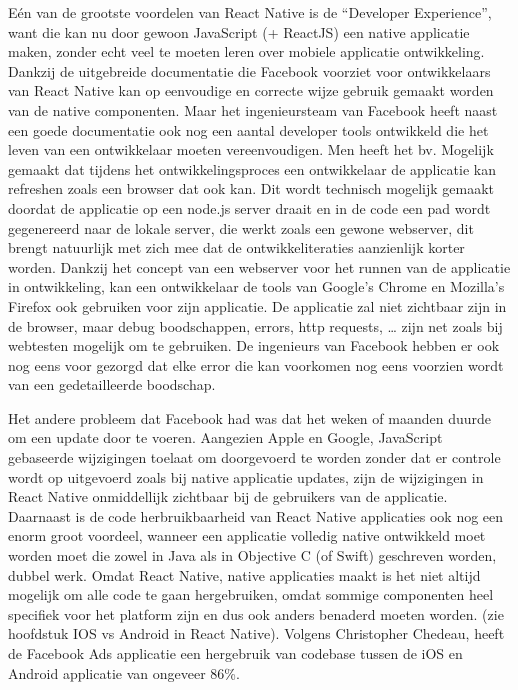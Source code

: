 Eén van de grootste voordelen van React Native is de ``Developer Experience'', want die kan nu door gewoon JavaScript (+ ReactJS) een native applicatie maken, zonder echt veel te moeten leren over mobiele applicatie ontwikkeling. Dankzij de uitgebreide documentatie die Facebook voorziet voor ontwikkelaars van React Native kan op eenvoudige en correcte wijze gebruik gemaakt worden van de native componenten. Maar het ingenieursteam van Facebook heeft naast een goede documentatie ook nog een aantal developer tools ontwikkeld die het leven van een ontwikkelaar moeten vereenvoudigen. Men heeft het bv. Mogelijk gemaakt dat tijdens het ontwikkelingsproces een ontwikkelaar de applicatie kan refreshen zoals een browser dat ook kan. Dit wordt technisch mogelijk gemaakt doordat de applicatie op een node.js server draait en in de code een pad wordt gegenereerd naar de lokale server, die werkt zoals een gewone webserver, dit brengt natuurlijk met zich mee dat de ontwikkeliteraties aanzienlijk korter worden.
Dankzij het concept van een webserver voor het runnen van de applicatie in ontwikkeling, kan een ontwikkelaar de tools van Google’s Chrome en Mozilla’s Firefox ook gebruiken voor zijn applicatie. De applicatie zal niet zichtbaar zijn in de browser, maar debug boodschappen, errors, http requests, … zijn net zoals bij webtesten mogelijk om te gebruiken. De ingenieurs van Facebook hebben er ook nog eens voor gezorgd dat elke error die kan voorkomen nog eens voorzien wordt van een gedetailleerde boodschap. 

Het andere probleem dat Facebook had was dat het weken of maanden duurde om een update door te voeren. Aangezien Apple en Google, JavaScript gebaseerde wijzigingen toelaat om doorgevoerd te worden zonder dat er controle wordt op uitgevoerd zoals bij native applicatie updates, zijn de wijzigingen in React Native onmiddellijk zichtbaar bij de gebruikers van de applicatie.
Daarnaast is de code herbruikbaarheid van React Native applicaties ook nog een enorm groot voordeel, wanneer een applicatie volledig native ontwikkeld moet worden moet die zowel in Java als in Objective C (of Swift) geschreven worden, dubbel werk. Omdat React Native, native applicaties maakt is het niet altijd mogelijk om alle code te gaan hergebruiken, omdat sommige componenten heel specifiek voor het platform zijn en dus ook anders benaderd moeten worden. (zie hoofdstuk IOS vs Android in React Native). Volgens Christopher Chedeau, heeft de Facebook Ads applicatie een hergebruik van codebase tussen de iOS en Android applicatie van ongeveer 86\%. \citep{chedeau:React} 

